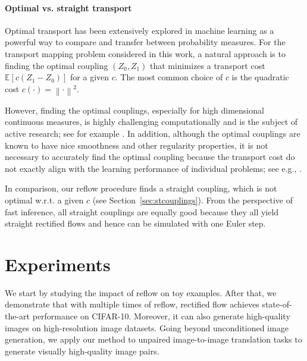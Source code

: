 \documentclass[11pt]{article}
\newcommand{\E}{\mathbb{E}}
\newcommand{\norm}[1]{\left\|#1\right\|}
\begin{document}
 



\paragraph{Optimal vs. straight transport}
Optimal transport has been extensively explored in machine learning 
as a powerful way to 
 compare and transfer between probability measures. 
 For the transport mapping problem considered in this work,
 a natural approach is to finding the optimal coupling $(Z_0,Z_1)$ that minimizes a transport cost $\E[c(Z_1-Z_0)]$ for a given $c$. 
 The most common choice of $c$ is the quadratic cost $c(\cdot) = \norm{\cdot}^2$. 
 
 However, 
 finding the optimal couplings, 
 especially for high dimensional continuous measures, is highly challenging computationally and is the subject of active research; 
 see for example \citep{seguy2017large, korotin2021neural, korotin2022neural, makkuva2020optimal, rout2021generative, daniels2021score}.    
 In addition, 
although the optimal couplings 
are known to have nice smoothness and other regularity properties, 
it is not necessary to accurately find the optimal coupling because the transport cost
do not exactly align with
the learning  performance of individual problems; see e.g., \cite{korotin2021neural}.  %
 
 
 
 
 In comparison, 
 our reflow procedure 
 finds a straight coupling, 
 which is not optimal w.r.t. a given $c$ (see Section~\ref{sec:stcouplings}).  
 From the perspective of fast inference, 
 all straight couplings are equally good because they all yield straight rectified flows and hence can be simulated with one Euler step. 
 
 







 
 
 
\section{Experiments}
\label{sec:empirical} 
We start by studying the impact of reflow on toy examples. 
After that, 
we demonstrate that with multiple times of reflow, rectified flow achieves state-of-the-art performance on CIFAR-10. 
Moreover, it can also generate high-quality images on high-resolution image datasets. 
Going beyond unconditioned image generation, we apply our method to unpaired image-to-image translation tasks to generate visually high-quality image pairs. 
\end{document}
